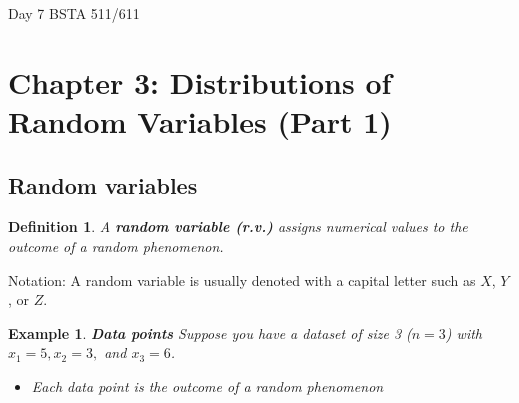 \documentclass[12pt]{amsart}
\newtheorem{definition}[theorem]{Definition}
\newtheorem{example}[theorem]{Example}
\begin{document}
\setcounter{section}{3}
Day 7 BSTA 511/611
{\huge  
\section*{Chapter 3: Distributions of Random Variables (Part 1)}
}



{\large 


%
%
%
%
%
%


\subsection{Random variables}

\begin{definition} A \textbf{random variable (r.v.)} assigns numerical values to the outcome of a random phenomenon.
\end{definition}

Notation: \newline 
A random variable is usually denoted with a capital letter such as $X$, $Y$, or $Z$.

\vspace{1cm}
\begin{example}  \textbf{Data points} \newline
Suppose you have a dataset of size 3 ($n=3$) with $x_1 = 5, x_2 = 3,$ and $x_3 = 6$. 
\begin{itemize}
\item Each data point is the outcome of a random phenomenon


\end{itemize}
\end{example}}
\end{document}

